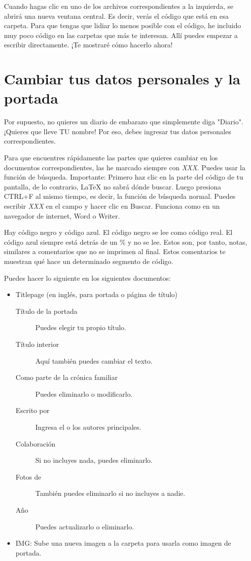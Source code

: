Cuando hagas clic en uno de los archivos correspondientes a la izquierda, se abrirá una nueva ventana central. Es decir, verás el código que está en esa carpeta. Para que tengas que lidiar lo menos posible con el código, he incluido muy poco código en las carpetas que más te interesan. Allí puedes empezar a escribir directamente. ¡Te mostraré cómo hacerlo ahora!

\section{Cambiar tus datos personales y la portada}
Por supuesto, no quieres un diario de embarazo que simplemente diga "Diario". ¡Quieres que lleve TU nombre! Por eso, debes ingresar tus datos personales correspondientes. \newline

Para que encuentres rápidamente las partes que quieres cambiar en los documentos correspondientes, las he marcado siempre con \emph{XXX}. Puedes usar la función de búsqueda. Importante: Primero haz clic en la parte del código de tu pantalla, de lo contrario, \LaTeX{} no sabrá dónde buscar. Luego presiona CTRL+F al mismo tiempo, es decir, la función de búsqueda normal. Puedes escribir \emph{XXX} en el campo y hacer clic en Buscar. Funciona como en un navegador de internet, Word o Writer. \newline

Hay código negro y código azul. El código negro se lee como código real. El código azul siempre está detrás de un \% y no se lee. Estos son, por tanto, notas, similares a comentarios que no se imprimen al final. Estos comentarios te muestran qué hace un determinado segmento de código.

Puedes hacer lo siguiente en los siguientes documentos:

\begin{itemize}
\item Titlepage (en inglés, para portada o página de título)
\begin{description}
\item[Título de la portada] Puedes elegir tu propio título.
\item[Título interior] Aquí también puedes cambiar el texto.
\item[Como parte de la crónica familiar] Puedes eliminarlo o modificarlo.
\item[Escrito por] Ingresa el o los autores principales.
\item[Colaboración] Si no incluyes nada, puedes eliminarlo.
\item[Fotos de] También puedes eliminarlo si no incluyes a nadie.
\item[Año] Puedes actualizarlo o eliminarlo.
\end{description}
    \item IMG: Sube una nueva imagen a la carpeta para usarla como imagen de portada.
\end{itemize}

